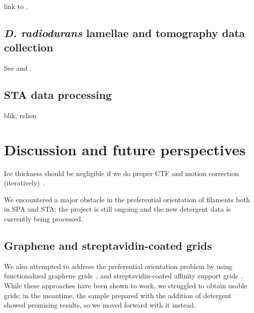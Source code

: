 link to .

\subsection{\textit{D. radiodurans} lamellae and tomography data collection}

See  and .

\subsection{STA data processing}

blik, relion

\section{Discussion and future perspectives}

Ice thickness should be negligible if we do proper CTF and motion correction (iteratively)~\cite{aiyerOvercomingResolutionAttenuation2024}.

We encountered a major obstacle in the preferential orientation of filaments both in SPA and STA; the project is still ongoing and the new detergent data is currently being processed.

\subsection{Graphene and streptavidin-coated grids}

We also attempted to address the preferential orientation problem by using functionalized graphene grids~\cite{luFunctionalizedGrapheneGrids2022}, and streptavidin-coated affinity support grids~\cite{crucifixImmobilizationBiotinylatedDNA2004,hanLongShelflifeStreptavidin2016}.
While these approaches have been shown to work, we struggled to obtain usable grids; in the meantime, the sample prepared with the addition of detergent showed promising results, so we moved forward with it instead.
